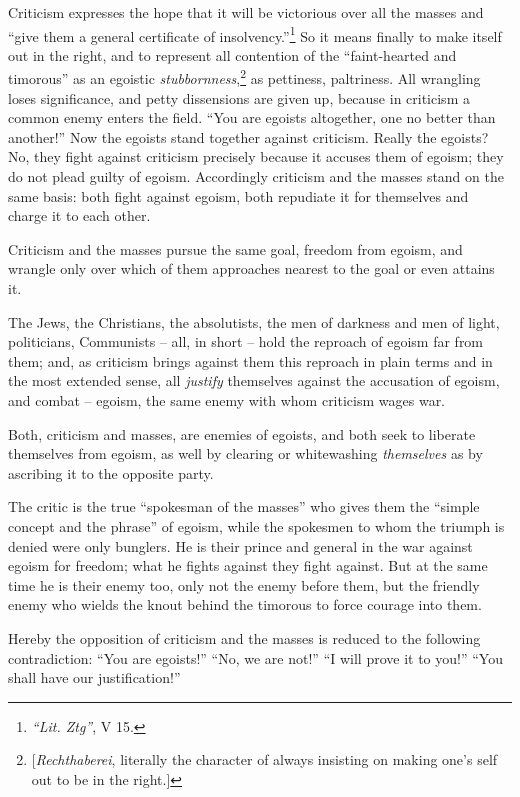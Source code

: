 \documentclass[12pt,a4paper]{book}
\begin{document}
Criticism expresses the hope that it will be victorious over all the masses 
and ``give them a general certificate of 
insolvency.''\footnote{\textit{``Lit. Ztg''}, V 15.} So it means finally to 
make itself out in the right, and to represent all contention of the 
``faint-hearted and timorous'' as an egoistic 
\textit{stubbornness},\footnote{[\textit{Rechthaberei}, literally the 
character of always insisting on making one's self out to be in the right.]} 
as pettiness, paltriness. All wrangling loses significance, and petty 
dissensions are given up, because in criticism a common enemy enters the 
field. ``You are egoists altogether, one no better than another!'' Now the 
egoists stand together against criticism. Really the egoists? No, they fight 
against criticism precisely because it accuses them of egoism; they do not 
plead guilty of egoism. Accordingly criticism and the masses stand on the same 
basis: both fight against egoism, both repudiate it for themselves and charge 
it to each other.

Criticism and the masses pursue the same goal, freedom from egoism, and 
wrangle only over which of them approaches nearest to the goal or even attains 
it.

The Jews, the Christians, the absolutists, the men of darkness and men of 
light, politicians, Communists -- all, in short -- hold the reproach of egoism 
far from them; and, as criticism brings against them this reproach in plain 
terms and in the most extended sense, all \textit{justify} themselves against 
the accusation of egoism, and combat -- egoism, the same enemy with whom 
criticism wages war.

Both, criticism and masses, are enemies of egoists, and both seek to liberate 
themselves from egoism, as well by clearing or whitewashing 
\textit{themselves} as by ascribing it to the opposite party.

The critic is the true ``spokesman of the masses'' who gives them the 
``simple concept and the phrase'' of egoism, while the spokesmen to whom the 
triumph is denied were only bunglers. He is their prince and general in the 
war against egoism for freedom; what he fights against they fight against. But 
at the same time he is their enemy too, only not the enemy before them, but 
the friendly enemy who wields the knout behind the timorous to force courage 
into them.

Hereby the opposition of criticism and the masses is reduced to the following 
contradiction: ``You are egoists!'' ``No, we are not!'' ``I will prove it 
to you!'' ``You shall have our justification!''
\end{document}
